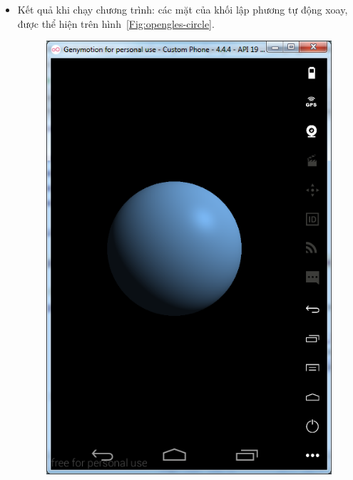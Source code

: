 \documentclass[13pt,a4paper]{extreport}
\begin{document}
	\newpage
	\begin{itemize}	
		\item Kết quả khi chạy chương trình: các mặt của khối lập phương tự động xoay, được thể hiện trên hình~\ref{Fig:opengles-circle}.
			\begin{figure}[!h]
				\begin{center}
					\includegraphics[scale=.6]{images/opengles-circle-1.png}
					\hspace{.5cm}

\end{center}
\end{figure}
\end{itemize}
\end{document}
